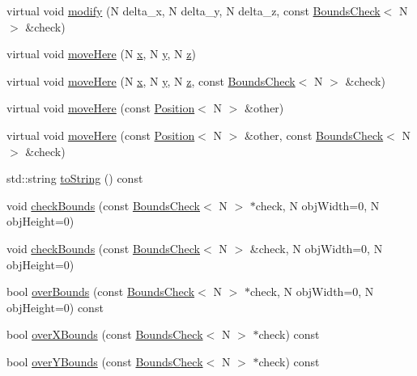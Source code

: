 \begin{DoxyCompactItemize}
virtual void \hyperlink{struct_position_aa3e6b4d0e63e42c91332ffba79359252}{modify} (N delta\-\_\-x, N delta\-\_\-y, N delta\-\_\-z, const \hyperlink{struct_bounds_check}{Bounds\-Check}$<$ N $>$ \&check)
\item 
virtual void \hyperlink{struct_position_a81dd41480a91a0817c1937afef4cb644}{move\-Here} (N \hyperlink{struct_position_af908be922fc88d89d81be7d08d06f761}{x}, N \hyperlink{struct_position_af434f54a0aad8bbfc3806ebdd197aa3b}{y}, N \hyperlink{struct_position_ac430da98504c2d4fd685c0363d728474}{z})
\item 
virtual void \hyperlink{struct_position_a4fa2e78d31d34daba2d555394c4e4b80}{move\-Here} (N \hyperlink{struct_position_af908be922fc88d89d81be7d08d06f761}{x}, N \hyperlink{struct_position_af434f54a0aad8bbfc3806ebdd197aa3b}{y}, N \hyperlink{struct_position_ac430da98504c2d4fd685c0363d728474}{z}, const \hyperlink{struct_bounds_check}{Bounds\-Check}$<$ N $>$ \&check)
\item 
virtual void \hyperlink{struct_position_a3840e7e0c17531cd254810fe62340f52}{move\-Here} (const \hyperlink{struct_position}{Position}$<$ N $>$ \&other)
\item 
virtual void \hyperlink{struct_position_aa268c21ec09dbe0b579b0854ef74ddb9}{move\-Here} (const \hyperlink{struct_position}{Position}$<$ N $>$ \&other, const \hyperlink{struct_bounds_check}{Bounds\-Check}$<$ N $>$ \&check)
\item 
std\-::string \hyperlink{struct_position_a4ebba65bc16bffa822c653522c5d7dcb}{to\-String} () const 
\item 
void \hyperlink{struct_position_afd2bfedb3b315412862103233665fc02}{check\-Bounds} (const \hyperlink{struct_bounds_check}{Bounds\-Check}$<$ N $>$ $\ast$check, N obj\-Width=0, N obj\-Height=0)
\item 
void \hyperlink{struct_position_aaf90e9e75b999bf2c43064feaa3694eb}{check\-Bounds} (const \hyperlink{struct_bounds_check}{Bounds\-Check}$<$ N $>$ \&check, N obj\-Width=0, N obj\-Height=0)
\item 
bool \hyperlink{struct_position_aac17c8dcac3808518f5e13c7ecf31c19}{over\-Bounds} (const \hyperlink{struct_bounds_check}{Bounds\-Check}$<$ N $>$ $\ast$check, N obj\-Width=0, N obj\-Height=0) const 
\item 
bool \hyperlink{struct_position_a06da33376bc3a116664f8a34e816ba95}{over\-X\-Bounds} (const \hyperlink{struct_bounds_check}{Bounds\-Check}$<$ N $>$ $\ast$check) const 
\item 
bool \hyperlink{struct_position_a45f215fed381839bf860752780a9660f}{over\-Y\-Bounds} (const \hyperlink{struct_bounds_check}{Bounds\-Check}$<$ N $>$ $\ast$check) const 
\end{DoxyCompactItemize}
